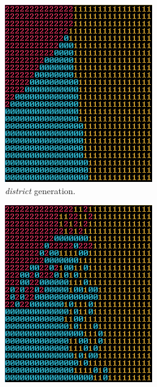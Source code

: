 	\begin{figure}[h]
		\begin{subfigure}{0.5\textwidth}
			\centering
			\includegraphics[width=0.9\linewidth]{"Images/map districts colored"}
			\caption{\textit{district} generation.}
			\label{fig:map-districts}
		\end{subfigure}
		\begin{subfigure}{0.5\textwidth}
			\centering
			\includegraphics[width=0.9\linewidth]{"Images/map borders colored"}

\end{subfigure}
\end{figure}
